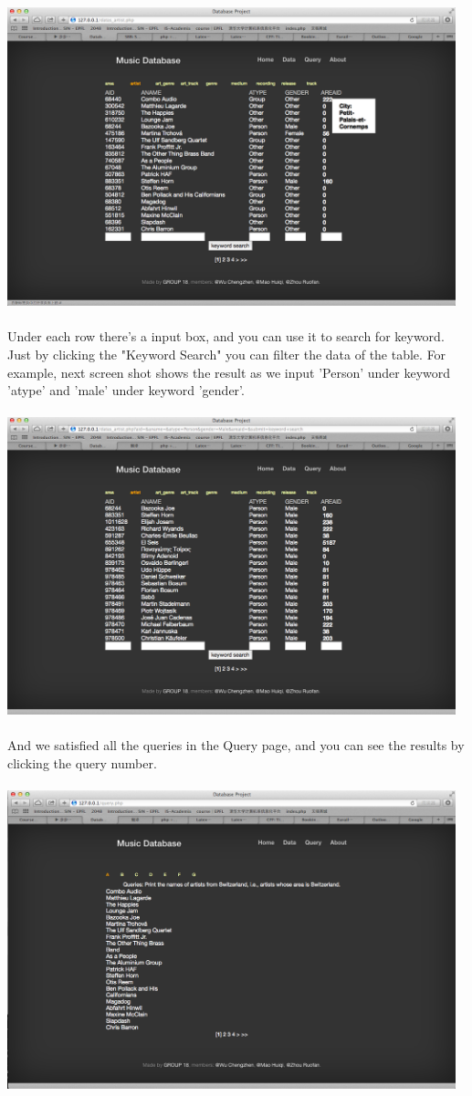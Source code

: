 \documentclass[11pt]{article} %
\begin{document}
{\includegraphics[width=13cm]{interface2}\\ \\
Under each row there's a input box, and you can use it to search for keyword. Just by clicking the "Keyword Search" you can filter the data of the table. For example, next screen shot shows the result as we input 'Person' under keyword 'atype' and 'male' under keyword 'gender'. \\ \\
\includegraphics[width=13cm]{interface3}\\ \\
And we satisfied all the queries in the Query page, and you can see the results by clicking the query number.\\ \\
\includegraphics[width=13cm]{interface4}\\ \\
}
\end{document}
